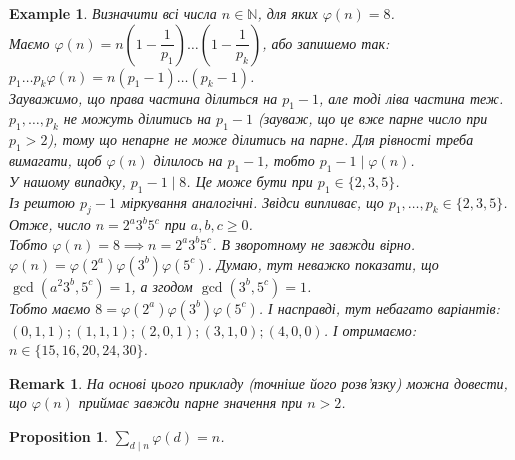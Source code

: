 \documentclass[a4paper, 14pt]{extarticle}
\theoremstyle{theoremdd}
\theoremstyle{theoremdd}
\theoremstyle{theoremdd}
\theoremstyle{theoremdd}
\newtheorem{example}[theorem]{Example}
\theoremstyle{theoremdd}
\newtheorem{proposition}[theorem]{Proposition}
\theoremstyle{theoremdd}
\newtheorem{remark}[theorem]{Remark}
\theoremstyle{theoremdd}
\theoremstyle{theoremdd}
\begin{document}
\begin{example}
Визначити всі числа $n \in \mathbb{N}$, для яких $\varphi(n) = 8$.\\
Маємо $\varphi(n) = n \left( 1 - \dfrac{1}{p_1} \right) \dots \left( 1 - \dfrac{1}{p_k} \right)$, або запишемо так:\\
$p_1 \dots p_k \varphi(n) = n(p_1-1) \dots (p_k-1)$.\\
Зауважимо, що права частина ділиться на $p_1-1$, але тоді ліва частина теж. $p_1,\dots,p_k$ не можуть ділитись на $p_1-1$ (зауваж, що це вже парне число при $p_1 > 2$), тому що непарне не може ділитись на парне. Для рівності треба вимагати, щоб $\varphi(n)$ ділилось на $p_1-1$, тобто $p_1 - 1 \mid \varphi(n)$.\\
У нашому випадку, $p_1-1 \mid 8$. Це може бути при $p_1 \in \{2,3,5\}$.\\
Із рештою $p_j - 1$ міркування аналогічні. Звідси випливає, що $p_1,\dots,p_k \in \{2,3,5\}$. Отже, число $n = 2^a 3^b 5^c$ при $a,b,c \geq 0$.\\
Тобто $\varphi(n) = 8 \implies n = 2^a3^b 5^c$. В зворотному не завжди вірно.
$\varphi(n) = \varphi(2^a) \varphi(3^b) \varphi(5^c)$. Думаю, тут неважко показати, що $\gcd(a^2 3^b, 5^c) = 1$, а згодом $\gcd(3^b,5^c) = 1$.\\
Тобто маємо $8 = \varphi(2^a) \varphi(3^b) \varphi(5^c)$. І насправді, тут небагато варіантів:\\
$(0,1,1); (1,1,1); (2,0,1); (3,1,0); (4,0,0)$. І отримаємо:\\
$n \in \{15,16,20,24,30\}$.
\end{example}

\begin{remark}
На основі цього прикладу (точніше його розв'язку) можна довести, що $\varphi(n)$ приймає завжди парне значення при $n > 2$.
\end{remark}

\begin{proposition}
$\displaystyle\sum_{d \mid n} \varphi(d) = n$.
\end{proposition}
\end{document}
